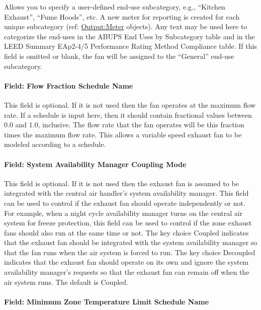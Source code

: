 Allows you to specify a user-defined end-use subcategory, e.g., ``Kitchen Exhaust'', ``Fume Hoods'', etc. A new meter for reporting is created for each unique subcategory (ref: \hyperref[outputmeter-and-outputmetermeterfileonly]{Output:Meter} objects). Any text may be used here to categorize the end-uses in the ABUPS End Uses by Subcategory table and in the LEED Summary EAp2-4/5 Performance Rating Method Compliance table. If this field is omitted or blank, the fan will be assigned to the ``General'' end-use subcategory.

\paragraph{Field: Flow Fraction Schedule Name}\label{field-flow-fraction-schedule-name}

This field is optional. If it is not used then the fan operates at the maximum flow rate. If a schedule is input here, then it should contain fractional values between 0.0 and 1.0, inclusive. The flow rate that the fan operates will be this fraction times the maximum flow rate. This allows a variable speed exhaust fan to be modeled according to a schedule.

\paragraph{Field: System Availability Manager Coupling Mode}\label{field-system-availability-manager-coupling-mode}

This field is optional. If it is not used then the exhaust fan is assumed to be integrated with the central air handler's system availability manager. This field can be used to control if the exhaust fan should operate independently or not. For example, when a night cycle availability manager turns on the central air system for freeze protection, this field can be used to control if the zone exhaust fans should also run at the same time or not. The key choice Coupled indicates that the exhaust fan should be integrated with the system availability manager so that the fan runs when the air system is forced to run. The key choice Decoupled indicates that the exhaust fan should operate on its own and ignore the system availability manager's requests so that the exhaust fan can remain off when the air system runs. The default is Coupled.

\paragraph{Field: Minimum Zone Temperature Limit Schedule Name}\label{field-minimum-zone-temperature-limit-schedule-name}


